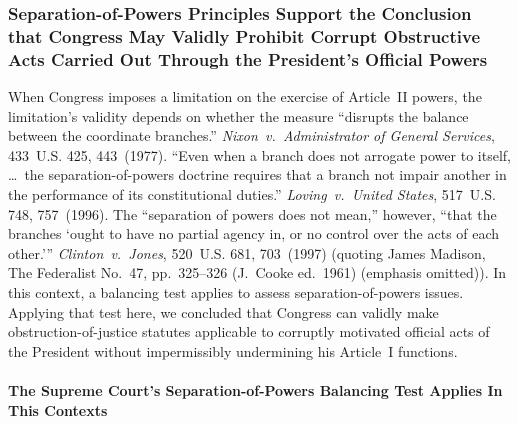 \subsubsection{Separation-of-Powers Principles Support the Conclusion that Congress May Validly Prohibit Corrupt Obstructive Acts Carried Out Through the President's Official Powers}

When Congress imposes a limitation on the exercise of Article~II powers, the limitation's validity depends on whether the measure ``disrupts the balance between the coordinate branches.''
\textit{Nixon~v.\ Administrator of General Services}, 433~U.S. 425, 443~(1977).
``Even when a branch does not arrogate power to itself, \dots\ the separation-of-powers doctrine requires that a branch not impair another in the performance of its constitutional duties.''
\textit{Loving~v.\ United States}, 517~U.S. 748, 757~(1996).
The ``separation of powers does not mean,'' however, ``that the branches `ought to have no partial agency in, or no control over the acts of each other.'\thinspace''
\textit{Clinton~v.\ Jones}, 520~U.S. 681, 703~(1997) (quoting James Madison, The Federalist No.~47, pp.~325--326 (J.~Cooke ed.~1961) (emphasis omitted)).
In this context, a balancing test applies to assess separation-of-powers issues.
Applying that test here, we concluded that Congress can validly make obstruction-of-justice statutes applicable to corruptly motivated official acts of the President without impermissibly undermining his Article~I functions.

\paragraph{The Supreme Court's Separation-of-Powers Balancing Test Applies In This Contexts}

